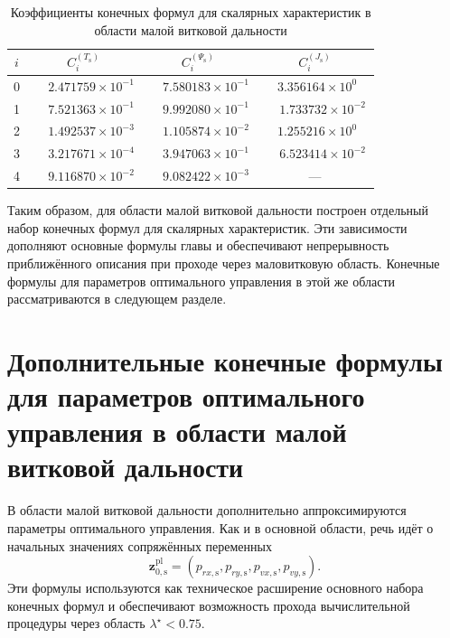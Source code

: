 \begin{table}[htbp]
	\centering
	\caption{Коэффициенты конечных формул для скалярных характеристик в области малой витковой дальности}
	\label{tab:chap2_short_scalar_coefficients}
	\begin{tabular}{|c|c|c|c|}
		\hline
		$i$ & $C_i^{(T_{\mathrm{s}})}$ & $C_i^{(\Psi_{\mathrm{s}})}$ & $C_i^{(J_{\mathrm{s}})}$ \\
		\hline
		0 & $\phantom{-}2.471759\times10^{-1}$ & $\phantom{-}7.580183\times10^{-1}$ & $\phantom{-}3.356164\times10^{0\phantom{-}}$ \\
		1 & $\phantom{-}7.521363\times10^{-1}$ & $\phantom{-}9.992080\times10^{-1}$ & $\phantom{-}1.733732\times10^{-2}$ \\
		2 & $\phantom{-}1.492537\times10^{-3}$ & $\phantom{-}1.105874\times10^{-2}$ & $\phantom{-}1.255216\times10^{0\phantom{-}}$ \\
		3 & $\phantom{-}3.217671\times10^{-4}$ & $\phantom{-}3.947063\times10^{-1}$ & $\phantom{-}6.523414\times10^{-2}$ \\
		4 & $\phantom{-}9.116870\times10^{-2}$ & $\phantom{-}9.082422\times10^{-3}$ & --- \\
		\hline
	\end{tabular}
\end{table}

Таким образом, для области малой витковой дальности построен отдельный набор конечных формул для скалярных характеристик. Эти зависимости дополняют основные формулы главы и обеспечивают непрерывность приближённого описания при проходе через маловитковую область. Конечные формулы для параметров оптимального управления в этой же области рассматриваются в следующем разделе.


\section{Дополнительные конечные формулы для параметров оптимального управления в области малой витковой дальности}

В области малой витковой дальности дополнительно аппроксимируются параметры оптимального управления. Как и в основной области, речь идёт о начальных значениях сопряжённых переменных
\begin{equation}
	\mathbf z^{\mathrm{pl}}_{0,\mathrm{s}}=
	\left(
	p_{rx,\mathrm{s}},
	p_{ry,\mathrm{s}},
	p_{vx,\mathrm{s}},
	p_{vy,\mathrm{s}}
	\right).
\end{equation}
Эти формулы используются как техническое расширение основного набора конечных формул и обеспечивают возможность прохода вычислительной процедуры через область $\lambda^\star<0.75$.

